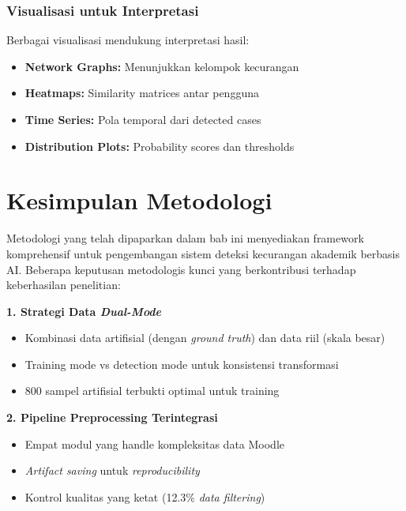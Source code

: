 \subsubsection{Visualisasi untuk Interpretasi}
\label{sec:visualisasiInterpretasi}

Berbagai visualisasi mendukung interpretasi hasil:

\begin{itemize}
    \item \textbf{Network Graphs:} Menunjukkan kelompok kecurangan
    \item \textbf{Heatmaps:} Similarity matrices antar pengguna
    \item \textbf{Time Series:} Pola temporal dari detected cases
    \item \textbf{Distribution Plots:} Probability scores dan thresholds
\end{itemize}

\section{Kesimpulan Metodologi}
\label{sec:kesimpulanBab3}

Metodologi yang telah dipaparkan dalam bab ini menyediakan framework komprehensif untuk pengembangan sistem deteksi kecurangan akademik berbasis AI. Beberapa keputusan metodologis kunci yang berkontribusi terhadap keberhasilan penelitian:

\textbf{1. Strategi Data \textit{Dual-Mode}}
\begin{itemize}
    \item Kombinasi data artifisial (dengan \textit{ground truth}) dan data riil (skala besar)
    \item Training mode vs detection mode untuk konsistensi transformasi
    \item 800 sampel artifisial terbukti optimal untuk training
\end{itemize}

\textbf{2. Pipeline Preprocessing Terintegrasi}
\begin{itemize}
    \item Empat modul yang handle kompleksitas data Moodle
    \item \textit{Artifact saving} untuk \textit{reproducibility}
    \item Kontrol kualitas yang ketat (12.3\% \textit{data filtering})
\end{itemize}

